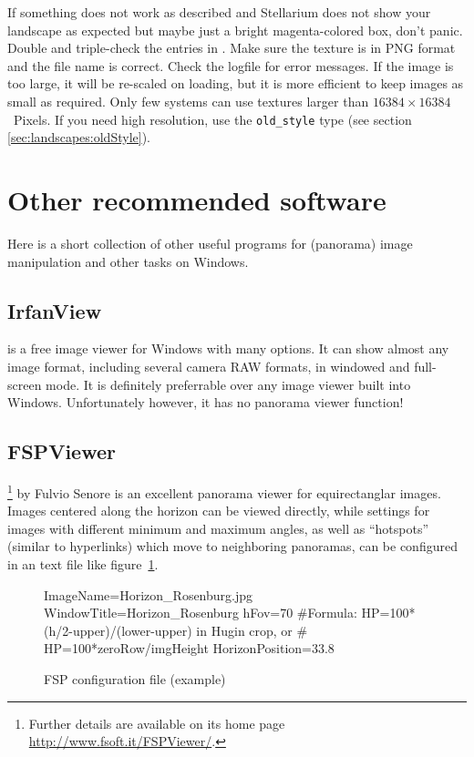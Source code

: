 If something does not work as described and Stellarium does not show
your landscape as expected but maybe just a bright magenta-colored
box, don't panic.  Double and triple-check the entries in
.  Make sure the texture is in
PNG format and the file name is correct. Check the logfile for error
messages. If the image is too large, it will be re-scaled on loading,
but it is more efficient to keep images as small as required. Only few
systems can use textures larger than $16384\times16384$~Pixels. If you
need high resolution, use the \texttt{old\_style} type (see section
\ref{sec:landscapes:oldStyle}).

\section{Other recommended software}
\label{sec:landscapes:otherSoftware}

Here is a short collection of other useful programs for (panorama)
image manipulation and other tasks on Windows.


\subsection{IrfanView}
\label{sec:landscapes:IrfanView}

 is a free image viewer for Windows with many
options. It can show almost any image format, including several camera
RAW formats, in windowed and full-screen mode. It is definitely
preferrable over any image viewer built into Windows. Unfortunately
however, it has no panorama viewer function!

\subsection{FSPViewer}
\label{sec:landscapes:FSPViewer}

\footnote{Further details are available on its home
  page \url{http://www.fsoft.it/FSPViewer/}.} by Fulvio
Senore is an excellent panorama viewer for equirectanglar
images. Images centered along the horizon can be viewed directly,
while settings for images with different minimum and maximum angles,
as well as ``hotspots'' (similar to hyperlinks) which move to
neighboring panoramas, can be configured in an  text file
like figure~\ref{fig:FSPexample}.


\begin{figure}[h]\centering
\begin{configfile}
ImageName=Horizon_Rosenburg.jpg
WindowTitle=Horizon_Rosenburg
hFov=70
#Formula: HP=100*(h/2-upper)/(lower-upper) in Hugin crop, or
#         HP=100*zeroRow/imgHeight
HorizonPosition=33.8
\end{configfile}
\caption{FSP configuration file (example)}
\label{fig:FSPexample}
\end{figure}

